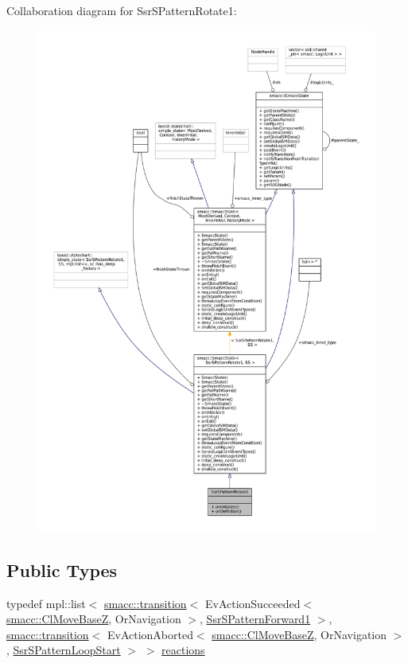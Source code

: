 Collaboration diagram for Ssr\+S\+Pattern\+Rotate1\+:
\nopagebreak
\begin{figure}[H]
\begin{center}
\leavevmode
\includegraphics[width=350pt]{structSsrSPatternRotate1__coll__graph}
\end{center}
\end{figure}
\subsection*{Public Types}
\begin{DoxyCompactItemize}
\item 
typedef mpl\+::list$<$ \hyperlink{classsmacc_1_1transition}{smacc\+::transition}$<$ Ev\+Action\+Succeeded$<$ \hyperlink{classsmacc_1_1ClMoveBaseZ}{smacc\+::\+Cl\+Move\+BaseZ}, Or\+Navigation $>$, \hyperlink{structSsrSPatternForward1}{Ssr\+S\+Pattern\+Forward1} $>$, \hyperlink{classsmacc_1_1transition}{smacc\+::transition}$<$ Ev\+Action\+Aborted$<$ \hyperlink{classsmacc_1_1ClMoveBaseZ}{smacc\+::\+Cl\+Move\+BaseZ}, Or\+Navigation $>$, \hyperlink{structSsrSPatternLoopStart}{Ssr\+S\+Pattern\+Loop\+Start} $>$ $>$ \hyperlink{structSsrSPatternRotate1_a47facb02d41f2e17a062221c111a4457}{reactions}
\end{DoxyCompactItemize}
